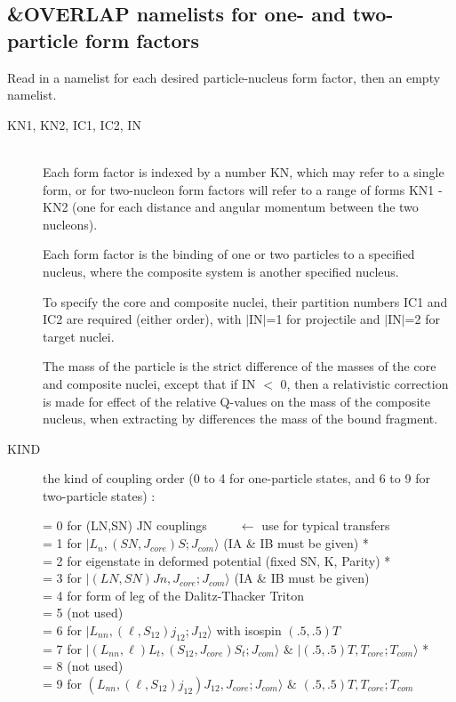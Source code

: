 \documentclass[11pt]{article}
\begin{document}
\newpage
\subsection{\&OVERLAP namelists for one- and two-particle form factors}
%


Read in a namelist for each desired particle-nucleus form factor, then an empty namelist.

\begin{description}
\item[KN1, KN2, IC1, IC2, IN]  ~\\
Each form factor is indexed by a number KN, which may refer to
a single form, or for two-nucleon form factors will refer to a range
of forms KN1 - KN2
(one for each distance and angular momentum between the two nucleons).

Each form factor is the binding of one or two particles to a
specified nucleus, where the composite system is another specified
nucleus.

To specify the core and composite nuclei, their partition numbers
IC1 and IC2 are required (either order), with $|$IN$|$=1 for projectile
and $|$IN$|$=2 for target nuclei.

The mass of the particle is the strict difference of the masses of
the core and composite nuclei, except that if IN $<$ 0, then a
relativistic correction is made for effect of the relative Q-values
on the mass of the composite nucleus, when extracting by differences
the mass of the bound fragment.


\item[KIND]
the kind of coupling order (0 to 4 for one-particle states, and
6 to 9 for two-particle states) :

= 0 for (LN,SN) JN couplings   ~ ~ ~$\leftarrow$ use for typical transfers\\
= 1 for $|L_{n}, (SN,J_{core})S ; J_{com}\rangle$  (IA \& IB must be given) *\\
= 2 for eigenstate in deformed potential (fixed SN, K, Parity)  *\\
= 3 for $|(LN,SN)Jn, J_{core}; J_{com}\rangle$    (IA \& IB must be given)\\
= 4 for form of leg of the Dalitz-Thacker Triton\\
= 5  (not used)\\
= 6 for $|L_{nn}, (\ell,S_{12})j_{12}; J_{12}\rangle$  with isospin $(.5,.5) T$\\
= 7 for $|(L_{nn},\ell)L_t, (S_{12},J_{core})S_t ;  J_{com}\rangle$ \& $|(.5,.5)T,T_{core};T_{com}\rangle$  *\\
= 8  (not used)\\
= 9 for $(L_{nn},(\ell,S_{12})j_{12})J_{12}, J_{core}; J_{com}\rangle$ \&
$(.5,.5)T,T_{core};T_{com}$


\end{description}
\end{document}
